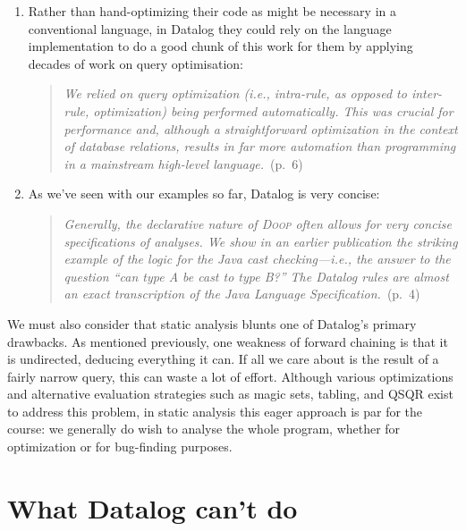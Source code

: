 \begin{enumerate}
\item Rather than hand-optimizing their code as might be necessary in a
  conventional language, in Datalog they could rely on the language
  implementation to do a good chunk of this work for them by applying decades of
  work on query optimisation:

  \begin{quote}
    \emph{We relied on query optimization (i.e., intra-rule, as opposed to
      inter-rule, optimization) being performed automatically. This was crucial
      for performance and, although a straightforward optimization in the
      context of database relations, results in far more automation than
      programming in a mainstream high-level language.}~(p.~6)
  \end{quote}
  
\item As we've seen with our examples so far, Datalog is very concise:
  
  \begin{quote}
    \emph{Generally, the declarative nature of \textsc{Doop} often allows for
      very concise specifications of analyses. We show in an earlier publication
      the striking example of the logic for the Java cast checking---i.e., the
      answer to the question ``can type A be cast to type B?'' The Datalog rules
      are almost an exact transcription of the Java Language
      Specification.}~(p.~4)
  \end{quote}
\end{enumerate}

\noindent
We must also consider that static analysis blunts one of Datalog's primary
drawbacks. As mentioned previously, one weakness of forward chaining is that it
is undirected, deducing everything it can. If all we care about is the result of
a fairly narrow query, this can waste a lot of effort. Although various
optimizations and alternative evaluation strategies such as magic sets, tabling,
and QSQR exist to address this
problem, in static analysis this eager approach is par for the course: we
generally do wish to analyse the whole program, whether for optimization or for
bug-finding purposes. 


\section{What Datalog can't do}

